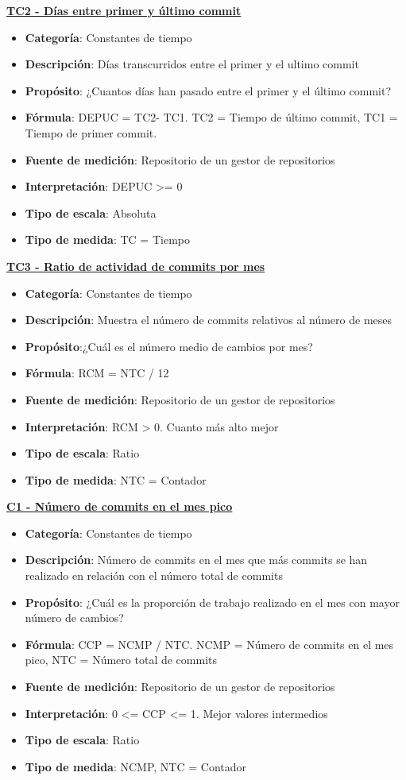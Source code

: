\textbf{\underline{TC2 - Días entre primer y último commit}}
\begin{itemize}
	\tightlist
	\item \textbf{Categoría}: Constantes de tiempo
	\item \textbf{Descripción}: Días transcurridos entre el primer y el ultimo commit 
	\item \textbf{Propósito}: ¿Cuantos días han pasado entre el primer y el último commit?
	\item \textbf{Fórmula}: DEPUC = TC2- TC1. TC2 = Tiempo de último commit, TC1 = Tiempo de primer commit.
	\item \textbf{Fuente de medición}: Repositorio de un gestor de repositorios
	\item \textbf{Interpretación}: DEPUC >= 0
	\item \textbf{Tipo de escala}: Absoluta
	\item \textbf{Tipo de medida}: TC = Tiempo
\end{itemize}
\textbf{\underline{TC3 - Ratio de actividad de commits por mes}}
\begin{itemize}
	\tightlist
	\item \textbf{Categoría}: Constantes de tiempo
	\item \textbf{Descripción}: Muestra el número de commits relativos al número de meses
	\item \textbf{Propósito}:¿Cuál es el número medio de cambios por mes?
	\item \textbf{Fórmula}: RCM = NTC / 12
	\item \textbf{Fuente de medición}: Repositorio de un gestor de repositorios
	\item \textbf{Interpretación}: RCM > 0. Cuanto más alto mejor
	\item \textbf{Tipo de escala}: Ratio
	\item \textbf{Tipo de medida}: NTC = Contador
\end{itemize}
\textbf{\underline{C1 - Número de commits en el mes pico}}
\begin{itemize}
	\tightlist
	\item \textbf{Categoría}: Constantes de tiempo
	\item \textbf{Descripción}: Número de commits en el mes que más commits se han realizado en relación con el número total de commits
	\item \textbf{Propósito}: ¿Cuál es la proporción de trabajo realizado en el mes con mayor número de cambios?
	\item \textbf{Fórmula}: CCP = NCMP / NTC. NCMP = Número de commits en el mes pico, NTC = Número total de commits
	\item \textbf{Fuente de medición}: Repositorio de un gestor de repositorios
	\item \textbf{Interpretación}: 0 <= CCP <= 1. Mejor valores intermedios
	\item \textbf{Tipo de escala}: Ratio
	\item \textbf{Tipo de medida}: NCMP, NTC = Contador
\end{itemize}

